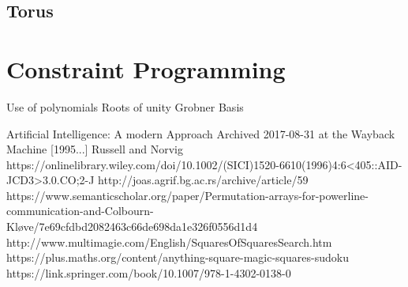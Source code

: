 \documentclass[a4paper,12pt]{article}
\begin{document}
	\subsection{Torus}
\section{Constraint Programming}
	Use of polynomials
	Roots of unity
	Grobner Basis

\begin{thebibliography}{100}
	 Artificial Intelligence: A modern Approach Archived 2017-08-31 at the Wayback Machine [1995...] Russell and Norvig
	 https://onlinelibrary.wiley.com/doi/10.1002/(SICI)1520-6610(1996)4:6<405::AID-JCD3>3.0.CO;2-J
	 http://joas.agrif.bg.ac.rs/archive/article/59
	 https://www.semanticscholar.org/paper/Permutation-arrays-for-powerline-communication-and-Colbourn-Kløve/7e69cfdbd2082463c66de698da1e326f0556d1d4
	 http://www.multimagie.com/English/SquaresOfSquaresSearch.htm
	 https://plus.maths.org/content/anything-square-magic-squares-sudoku
	 https://link.springer.com/book/10.1007/978-1-4302-0138-0
\end{thebibliography}
\end{document}
